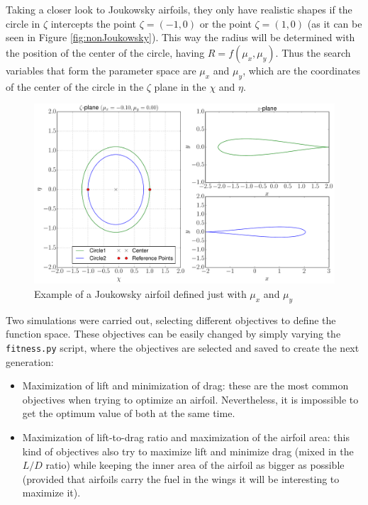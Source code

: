 \newpage

Taking a closer look to Joukowsky airfoils, they only have realistic shapes if the circle in $\zeta$ intercepts the point $\zeta = (-1,0)$ or the point $\zeta = (1,0)$ (as it can be seen in Figure \ref{fig:nonJoukowsky}). This way the radius will be determined with the position of the center of the circle, having $R=f(\mu_x,\mu_y)$. Thus the search variables that form the parameter space are $\mu_x$ and $\mu_y$, which are the coordinates of the center of the circle in the $\zeta$ plane in the $\chi$ and $\eta$.

     \begin{figure}[h!]
        \centering
        \includegraphics[width=\textwidth]{Figures/3/J_0.pdf}
        \caption{Example of a Joukowsky airfoil defined just with $\mu_x$ and $\mu_y$}
        \label{fig:joukowskyTheory}
    \end{figure}
    
Two simulations were carried out, selecting different objectives to define the function space. These objectives can be easily changed by simply varying the \texttt{fitness.py} script, where the objectives are selected and saved to create the next generation:

\begin{itemize}
    \item Maximization of lift and minimization of drag: these are the most common objectives when trying to optimize an airfoil. Nevertheless, it is impossible to get the optimum value of both at the same time.
    \item Maximization of lift-to-drag ratio and maximization of the airfoil area: this kind of objectives also try to maximize lift and minimize drag (mixed in the $L/D$ ratio) while keeping the inner area of the airfoil as bigger as possible (provided that airfoils carry the fuel in the wings it will be interesting to maximize it). 
\end{itemize}

